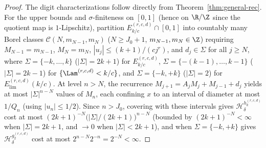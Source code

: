 \begin{proof}
The digit characterizations follow directly from Theorem~\ref{thm:general-rec}.
For the upper bounds and $\sigma$-finiteness on $[0,1]$ (hence on $\R/\Z$ since
the quotient map is $1$-Lipschitz), partition $E_{k/c}^{(r,c,d)}\cap[0,1]$ into
countably many Borel classes $\mathcal C(N,m_{N-1},m_N)$ ($N\ge J_0+1$,
$m_{N-1},m_N\in\Z$) requiring $M_{N-1}=m_{N-1}$, $M_N=m_N$,
$|u_j|\le(k+1)/(cj^r)$, and $d_j\in\Sigma$ for all $j\ge N$, where
$\Sigma=\{-k,\dots,k\}$ ($|\Sigma|=2k+1$) for $E_{k/c}^{(r,c,d)}$,
$\Sigma=\{-(k-1),\dots,k-1\}$ ($|\Sigma|=2k-1$) for $\{\Lam^{(r,c,d)}<k/c\}$,
and $\Sigma=\{-k,+k\}$ ($|\Sigma|=2$) for $E_{\mathrm{lim}}^{(r,c,d)}(k/c)$.
At level $n>N$, the recurrence $M_{j+1}=A_jM_j+M_{j-1}+d_j$ yields at most
$|\Sigma|^{n-N}$ values of $M_n$, each confining $x$ to an interval of diameter
at most $1/Q_n$ (using $|u_n|\le1/2$). Since $n>J_0$, covering with these
intervals gives $\mathcal H_\delta^{h_k^{(r,c,d)}}$ cost at most
$(2k+1)^{-N}\bigl(|\Sigma|/(2k+1)\bigr)^{n-N}$ (bounded by $(2k+1)^{-N}<\infty$
when $|\Sigma|=2k+1$, and $\to0$ when $|\Sigma|<2k+1$), and when $\Sigma=\{-k,+k\}$
gives $\mathcal H_\delta^{g_2^{(r,c,d)}}$ cost at most $2^{n-N}2^{-n}=2^{-N}<\infty$.


\end{proof}
